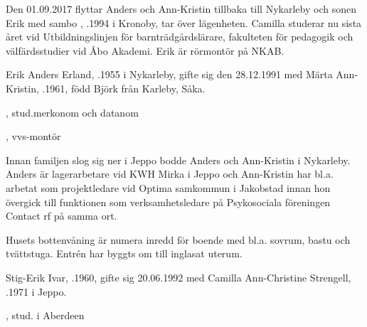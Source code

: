 %
Den 01.09.2017 flyttar Anders och Ann-Kristin tillbaka till Nykarleby och sonen Erik med sambo , .1994 i Kronoby, tar över lägenheten. Camilla studerar nu sista året vid Utbildningslinjen för barnträdgårdslärare, fakulteten för pedagogik och välfärdsstudier vid Åbo Akademi. Erik är rörmontör på NKAB.



%
Erik Anders Erland, .1955 i Nykarleby, gifte sig den 28.12.1991 med Märta Ann-Kristin, .1961, född Björk från Karleby, Såka.
\begin{jhchildren}
  \item {}, stud.merkonom och datanom
  \item {}, vvs-montör
\end{jhchildren}

Innan familjen slog sig ner i Jeppo bodde Anders och Ann-Kristin i Nykarleby. Anders är lagerarbetare vid KWH Mirka i Jeppo och Ann-Kristin har bl.a. arbetat som projektledare vid Optima samkommun i Jakobstad innan hon övergick till funktionen som verksamhetsledare på Psykosociala föreningen Contact rf på samma ort.

Husets bottenvåning är numera inredd för boende med bl.a. sovrum, bastu och tvättstuga. Entrén har byggts om till inglasat uterum.


%
Stig-Erik Ivar, .1960, gifte sig 20.06.1992 med Camilla Ann-Christine Strengell, .1971 i Jeppo.
\begin{jhchildren}
  \item {}, stud. i Aberdeen
  \item {}
  \item {}
  \item {}
\end{jhchildren}

